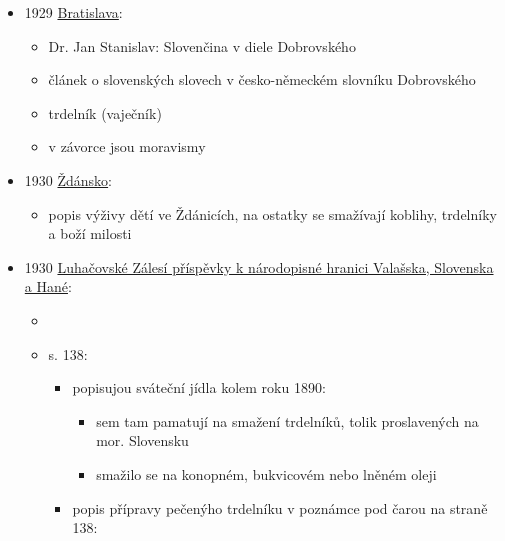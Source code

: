 \begin{itemize}
  \begin{itemize}
  \tightlist
  \item
    Štramberk na Moravě a jeho dobrý genius: k pětašedesátinám dr. A.
    Hrstky
  \item
    poznámka, že trdelníky jsou valašský pečivo na způsob kremrolí
  \end{itemize}
\item
  1929
  \href{https://dikda.snk.sk/uuid/uuid:57ed0714-2a6c-433f-95a5-c0a9f19d2d1f}{Bratislava}:

  \begin{itemize}
  \tightlist
  \item
    Dr. Jan Stanislav: Slovenčina v diele Dobrovského
  \item
    článek o slovenských slovech v česko-německém slovníku Dobrovského
  \item
    trdelník (vaječník)
  \item
    v závorce jsou moravismy
  \end{itemize}
\item
  1930
  \href{https://ceskadigitalniknihovna.cz/view/uuid:e8387412-1c76-452f-9ecf-f705f1af03b3?page=uuid\%3Acd84eba0-525b-11e5-a788-0050569d679d&fulltext=trdeln\%C3\%ADk\%20OR\%20trdeln\%C3\%ADky\%20OR\%20trdeln\%C3\%ADk\%C5\%AF&source=mzk}{Ždánsko}:

  \begin{itemize}
  \tightlist
  \item
    popis výživy dětí ve Ždánicích, na ostatky se smažívají koblihy,
    trdelníky a boží milosti
  \end{itemize}
\item
  1930
  \href{https://ndk.cz/view/uuid:2d9fa8a0-5063-11e4-8344-005056827e52?page=uuid:1b35e0b0-77b1-11e4-9605-005056825209&fulltext=trdeln\%C3\%ADk\%C5\%AF}{Luhačovské
  Zálesí příspěvky k národopisné hranici Valašska, Slovenska a Hané}:

  \begin{itemize}
  \tightlist
  \item
  \item
    s. 138:

    \begin{itemize}
    \tightlist
    \item
      popisujou sváteční jídla kolem roku 1890:

      \begin{itemize}
      \tightlist
      \item
        sem tam pamatují na smažení trdelníků, tolik proslavených na
        mor. Slovensku
      \item
        smažilo se na konopném, bukvicovém nebo lněném oleji
      \end{itemize}
    \item
      popis přípravy pečenýho trdelníku v poznámce pod čarou na straně
      138:


\end{itemize}
\end{itemize}
\end{itemize}
